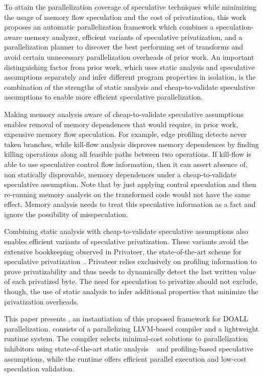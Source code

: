 To attain the parallelization coverage of speculative techniques
while minimizing the usage of memory flow speculation and the cost of
privatization,
%
this work proposes an automatic parallelization framework which
combines a speculation-aware memory analyzer, efficient variants of
speculative privatization, and a parallelization planner
to discover the best performing set of transforms and avoid certain
unnecessary parallelization overheads of prior work.
%
An important distinguishing factor from prior work, which uses static
analysis and speculative assumptions separately and infer different
program properties in isolation, is the combination of the strengths of
static analysis and cheap-to-validate speculative assumptions to
enable more efficient speculative parallelization.

Making memory analysis aware of cheap-to-validate speculative
assumptions enables removal of memory dependences that would require,
in prior work, expensive memory flow speculation.
%
For example, edge profiling detects never taken branches, while
kill-flow analysis disproves memory dependences by finding killing
operations along all feasible paths between two operations. If
kill-flow is able to use speculative control flow information, then it
can assert absence of, non statically disprovable, memory dependences
under a cheap-to-validate speculative assumption.
Note that by just applying control speculation and then re-running
memory analysis on the transformed code would not have the same
effect.  Memory analysis needs to treat this speculative information
as a fact and ignore the possibility of misspeculation.

Combining static analysis with cheap-to-validate speculative
assumptions also enables efficient variants of speculative
privatization.
%
These variants avoid the extensive bookkeeping observed in
Privateer, the state-of-the-art scheme for speculative
privatization~\cite{johnson:12:pldi}.
%
Privateer relies exclusively on profiling
information to prove privatizability and thus needs to dynamically
detect the last written value of each privatized byte.
%
The need for speculation to privatize should not exclude, though, the
use of static analysis to infer additional properties that minimize
the privatization overheads.

This paper presents \name, an instantiation of this proposed framework
for DOALL parallelization. \name consists of a parallelizing
LLVM-based compiler and a lightweight
runtime system. The compiler selects minimal-cost solutions to
parallelization inhibitors using state-of-the-art static analysis
~\cite{johnson:14:pldi} and profiling-based speculative
assumptions, while the runtime offers efficient parallel execution and
low-cost speculation validation.


